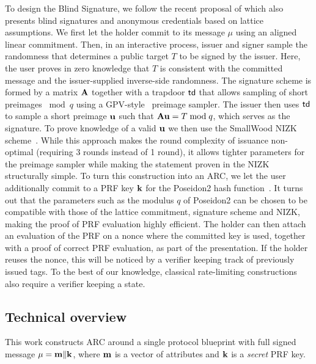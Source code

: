 To design the Blind Signature, we follow the recent proposal of
\cite{C:BLNS23,CCS:LyuSeiSte24,PKC:DKLW25} which also presents blind signatures and anonymous credentials based on
lattice assumptions. We first let the holder commit to its message \(\mu\) using an aligned linear commitment. Then, in
an interactive process, issuer and signer sample the randomness that determines a public target \(T\) to be signed by
the issuer. Here, the user proves in zero knowledge that \(T\) is consistent with the committed message and the
issuer-supplied inverse-side randomness. The signature scheme is formed by a matrix \(\mathbf{A}\) together with a trapdoor
\(\mathsf{td}\) that allows sampling of short preimages \(\bmod q\) using a GPV-style~\cite{STOC:GenPeiVai08}
preimage sampler. The issuer then uses \(\mathsf{td}\) to sample a short preimage \(\mathbf{u}\) such that \(\mathbf{A} \mathbf{u}=T
\bmod q\), which serves as the signature. To prove knowledge of a valid \(\mathbf{u}\) we then use the SmallWood NIZK
scheme~\cite{EPRINT:FenRiv25b}. While this approach makes the round complexity of issuance non-optimal (requiring 3
rounds instead of 1 round), it allows tighter parameters for the preimage sampler while making the statement proven in
the NIZK structurally simple. To turn this construction into an ARC, we let the user additionally commit to a PRF key
\(\mathbf{k}\) for the Poseidon2 hash function~\cite{AFRICACRYPT:GraKhoSch23}. It turns out that the parameters such as the
modulus \(q\) of Poseidon2 can be chosen to be compatible with those of the lattice commitment, signature scheme and
NIZK, making the proof of PRF evaluation highly efficient. The holder can then attach an evaluation of the PRF on a
nonce where the committed key is used, together with a proof of correct PRF evaluation, as part of the presentation. If
the holder reuses the nonce, this will be noticed by a verifier keeping track of previously issued tags. To the best of
our knowledge, classical rate-limiting constructions also require a verifier keeping a state.~\cite{rfc9578,ietf-privacypass-arc-protocol-01,schlesinger-cfrg-act-00}

\subsection{Technical overview}

This work constructs ARC around a single protocol blueprint with full signed message
\(\mathbf{\mu}=\mathbf{m}\Vert \mathbf{k}\), where \(\mathbf{m}\) is a vector of attributes and \(\mathbf{k}\) is a \emph{secret} PRF key.

